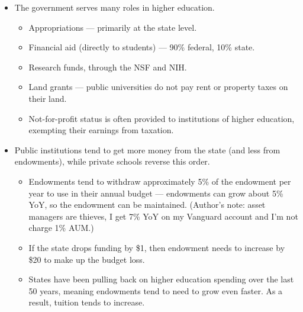 \documentclass[10pt]{extarticle}
\begin{document}
\begin{itemize}
\begin{itemize}
      \end{itemize}
    \item The government serves many roles in higher education.
      \begin{itemize}
        \item Appropriations --- primarily at the state level.
        \item Financial aid (directly to students) --- 90\% federal, 10\% state.
        \item Research funds, through the NSF and NIH.
        \item Land grants --- public universities do not pay rent or property taxes on their land.
        \item Not-for-profit status is often provided to institutions of higher education, exempting their earnings from taxation.
      \end{itemize}
    \item Public institutions tend to get more money from the state (and less from endowments), while private schools reverse this order.
      \begin{itemize}
        \item Endowments tend to withdraw approximately 5\% of the endowment per year to use in their annual budget --- endowments can grow about 5\% YoY, so the endowment can be maintained. (Author's note: asset managers are thieves, I get 7\% YoY on my Vanguard account and I'm not charge 1\% AUM.)
        \item If the state drops funding by \$1, then endowment needs to increase by \$20 to make up the budget loss.
        \item States have been pulling back on higher education spending over the last 50 years, meaning endowments tend to need to grow even faster. As a result, tuition tends to increase.
      \end{itemize}
  \end{itemize}
\end{document}
